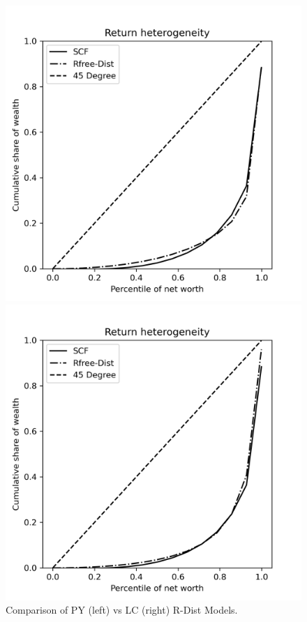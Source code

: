 \begin{figure}[h]
    \centering
    \begin{minipage}{0.48\textwidth}
        \centering
        \includegraphics[width=\textwidth]{../Figures/Lognorm_PYrrDistNetWorth_2004Plot.png}
    \end{minipage}
    \hfill
    \begin{minipage}{0.48\textwidth}
        \centering
        \includegraphics[width=\textwidth]{../Figures/Lognorm_LCrrDistNetWorth_2004Plot.png}
    \end{minipage}
    \caption{Comparison of PY (left) vs LC (right) R-Dist Models.}
    \label{fig:PYLCLognorm} 
\end{figure}

